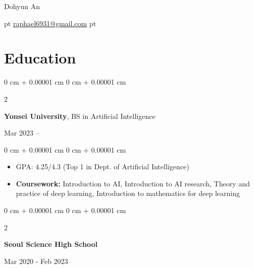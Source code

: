 \documentclass[10pt, letterpaper]{article}
\newenvironment{highlights}{
    \begin{itemize}[
        topsep=0.10 cm,
        parsep=0.10 cm,
        partopsep=0pt,
        itemsep=0pt,
        leftmargin=0 cm + 10pt
    ]
}{
    \end{itemize}
} %
\newenvironment{onecolentry}{
    \begin{adjustwidth}{
        0 cm + 0.00001 cm
    }{
        0 cm + 0.00001 cm
    }
}{
    \end{adjustwidth}
} %
\newenvironment{twocolentry}[2][]{
    \onecolentry
    \def\secondColumn{#2}
    \setcolumnwidth{\fill, 4.5 cm}
    \begin{paracol}{2}
}{
    \switchcolumn \raggedleft \secondColumn
    \end{paracol}
    \endonecolentry
} %
\newenvironment{header}{
    \setlength{\topsep}{0pt}\par\kern\topsep\centering\linespread{1.5}
}{
    \par\kern\topsep
} %
\let\hrefWithoutArrow\href
\begin{document}
    \newcommand{\AND}{\unskip
        \cleaders\copy\ANDbox\hskip\wd\ANDbox
        \ignorespaces
    }
    \newsavebox\ANDbox
    \sbox\ANDbox{$|$}

    \begin{header}
        \fontsize{25 pt}{25 pt}\selectfont Dohyun An

        \vspace{5 pt}

        \normalsize

         pt%
        \mbox{\hrefWithoutArrow{mailto:raphael6931@gmail.com}{raphael6931@gmail.com}}%
         pt%

    \end{header}

    \vspace{5 pt - 0.3 cm}

    \section{Education}
        \begin{twocolentry}{
            Mar 2023 –
        }
            \textbf{Yonsei University}, BS in Artificial Intelligence
        \end{twocolentry}
        \vspace{0.10 cm}
        \begin{onecolentry}
            \begin{highlights}
                \item GPA: 4.25/4.3 (Top 1 in Dept. of Artificial Intelligence)
                \item \textbf{Coursework:} Introduction to AI, Introduction to AI research, Theory and practice of deep learning, Introduction to mathematics for deep learning
            \end{highlights}
        \end{onecolentry}
        \vspace{0.20 cm}
        \begin{twocolentry}{
            Mar 2020 - Feb 2023
        }
            \textbf{Seoul Science High School}
        \end{twocolentry}
\end{document}
